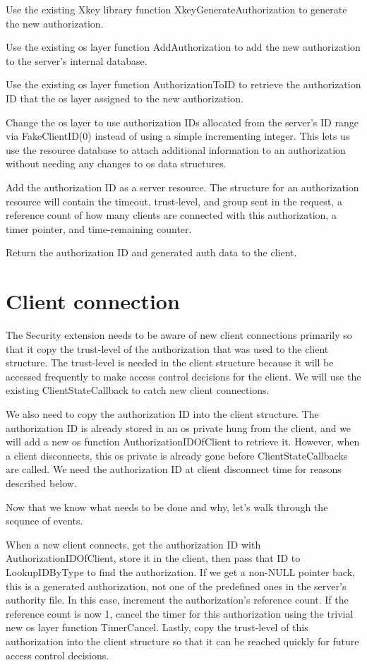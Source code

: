 Use the existing Xkey library function XkeyGenerateAuthorization to
generate the new authorization.

Use the existing os layer function AddAuthorization to add the new
authorization to the server's internal database.

Use the existing os layer function AuthorizationToID to retrieve the
authorization ID that the os layer assigned to the new authorization.

Change the os layer to use authorization IDs allocated from the
server's ID range via FakeClientID(0) instead of using a simple
incrementing integer.  This lets us use the resource database to
attach additional information to an authorization without needing any
changes to os data structures.

Add the authorization ID as a server resource.  The structure for an
authorization resource will contain the timeout, trust-level, and
group sent in the request, a reference count of how many clients are
connected with this authorization, a timer pointer, and time-remaining
counter.

Return the authorization ID and generated auth data to the client.


\section{Client connection}

The Security extension needs to be aware of new client connections
primarily so that it copy the trust-level of the authorization that
was used to the client structure.  The trust-level is needed in the
client structure because it will be accessed frequently to make access
control decisions for the client.  We will use the existing
ClientStateCallback to catch new client connections.

We also need to copy the authorization ID into the client structure.
The authorization ID is already stored in an os private hung from the
client, and we will add a new os function AuthorizationIDOfClient to
retrieve it.  However, when a client disconnects, this os private is
already gone before ClientStateCallbacks are called.  We need the
authorization ID at client disconnect time for reasons described
below.

Now that we know what needs to be done and why, let's walk through
the sequnce of events.

When a new client connects, get the authorization ID with
AuthorizationIDOfClient, store it in the client, then pass that ID to
LookupIDByType to find the authorization.  If we get a non-NULL
pointer back, this is a generated authorization, not one of the
predefined ones in the server's authority file.  In this case,
increment the authorization's reference count.  If the reference count
is now 1, cancel the timer for this authorization using the trivial
new os layer function TimerCancel.  Lastly, copy the trust-level of
this authorization into the client structure so that it can be reached
quickly for future access control decisions.

